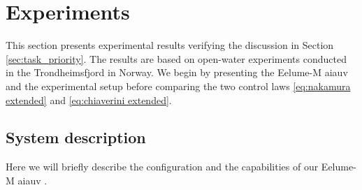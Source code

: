 \documentclass[../main.tex]{subfiles}
\begin{document}
\section{Experiments}
\label{sec:experiments}
%
This section presents experimental results verifying the discussion in Section \ref{sec:task_priority}. The results are based on open-water experiments conducted in the Trondheimsfjord in Norway.
We begin by presenting the Eelume-M \gls{aiauv} and the experimental setup before comparing the two control laws \eqref{eq:nakamura extended} and \eqref{eq:chiaverini extended}.



\subsection{System description}
Here we will briefly describe the configuration and the capabilities of our Eelume-M \gls{aiauv} \cite{eelumeMseries}.
\end{document}
